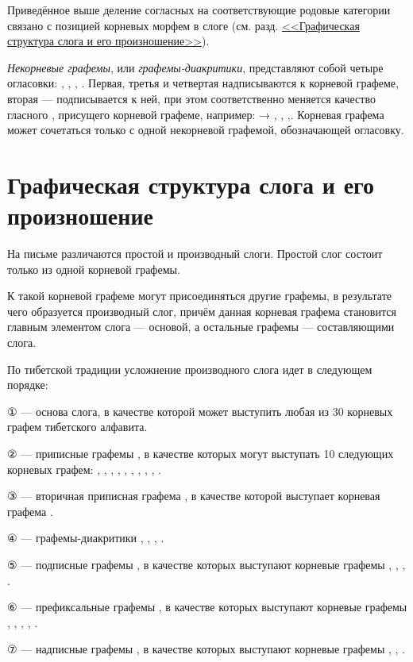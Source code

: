 Приведённое выше деление согласных на соответствующие родовые категории связано с позицией корневых морфем в слоге (см. разд. \hyperref[sec:gss]{<<Графическая структура слога и его произношение>>}).

\emph{Некорневые графемы}, или \emph{графемы-диакритики}, представляют собой четыре огласовки: , , , . Первая, третья и четвертая надписываются к корневой графеме, вторая --- подписывается к ней, при этом соответственно меняется качество гласного , присущего корневой графеме, например:  {\unifont →} , , ,. Корневая графема может сочетаться только с одной некорневой графемой, обозначающей огласовку.

\section{Графическая структура слога и его произношение}
\label{sec:gss}

На письме различаются простой и производный слоги. Простой слог состоит только из одной корневой графемы.

К такой корневой графеме могут присоединяться другие графемы, в результате чего образуется производный слог, причём данная корневая графема становится главным элементом слога --- основой, а остальные графемы --- составляющими слога.

По тибетской традиции усложнение производного слога идет в следующем порядке:
\begin{description}
	\item {\unifont ①} --- основа слога, в качестве которой может выступить любая из 30 корневых графем тибетского алфавита.
	\item {\unifont ②} --- приписные графемы , в качестве которых могут выступать 10 следующих корневых графем: , , , , , , , , , .
	\item {\unifont ③} --- вторичная приписная графема , в качестве которой выступает корневая графема .
	\item {\unifont ④} --- графемы-диакритики , , , .
	\item {\unifont ⑤} --- подписные графемы , в качестве которых выступают корневые графемы , , , .
	\item {\unifont ⑥} --- префиксальные графемы , в качестве которых выступают корневые графемы , , , , .
	\item {\unifont ⑦} --- надписные графемы , в качестве которых выступают корневые графемы , , .
\end{description}

